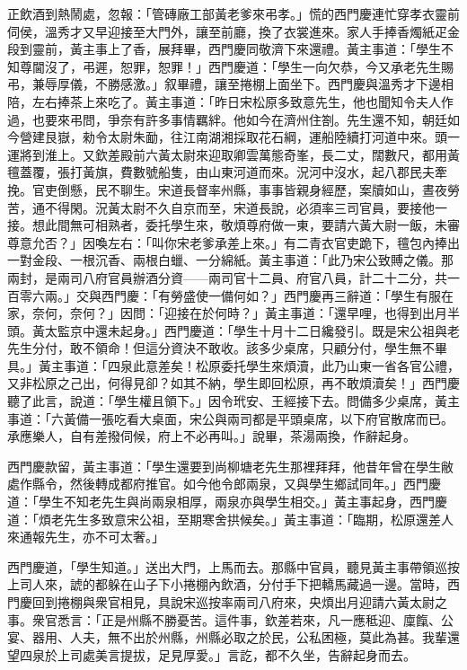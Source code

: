 正飲酒到熱鬧處，忽報：「管磚廠工部黃老爹來弔孝。」慌的西門慶連忙穿孝衣靈前伺侯，溫秀才又早迎接至大門外，讓至前廳，換了衣裳進來。家人手捧香燭紙疋金段到靈前，黃主事上了香，展拜畢，西門慶同敬濟下來還禮。黃主事道：「學生不知尊閫沒了，弔遲，恕罪，恕罪！」西門慶道：「學生一向欠恭，今又承老先生賜弔，兼辱厚儀，不勝感激。」叙畢禮，讓至捲棚上面坐下。西門慶與溫秀才下邊相陪，左右捧茶上來吃了。黃主事道：「昨日宋松原多致意先生，他也聞知令夫人作過，也要來弔問，爭奈有許多事情羈絆。他如今在濟州住劄。先生還不知，朝廷如今營建艮嶽，勑令太尉朱勔，往江南湖湘採取花石綱，運船陸續打河道中來。頭一運將到淮上。又欽差殿前六黃太尉來迎取卿雲萬態奇峯，長二丈，闊數尺，都用黃氊蓋覆，張打黃旗，費數號船隻，由山東河道而來。況河中沒水，起八郡民夫牽挽。官吏倒懸，民不聊生。{}宋道長督率州縣，事事皆親身經歷，案牘如山，晝夜勞苦，通不得閑。況黃太尉不久自京而至，宋道長說，必須率三司官員，要接他一接。想此間無可相熟者，委托學生來，敬煩尊府做一東，要請六黃大尉一飯，未審尊意允否？」因喚左右：「叫你宋老爹承差上來。」有二青衣官吏跪下，氊包內捧出一對金段、一根沉香、兩根白蠟、一分綿紙。黃主事道：「此乃宋公致賻之儀。那兩封，是兩司八府官員辦酒分資——兩司官十二員、府官八員，計二十二分，共一百零六兩。」交與西門慶：「有勞盛使一備何如？」西門慶再三辭道：「學生有服在家，奈何，奈何？」因問：「迎接在於何時？」黃主事道：「還早哩，也得到出月半頭。黃太監京中還未起身。」西門慶道：「學生十月十二日纔發引。既是宋公祖與老先生分付，敢不領命！但這分資決不敢收。該多少桌席，只顧分付，學生無不畢具。」黃主事道：「四泉此意差矣！松原委托學生來煩瀆，此乃山東一省各官公禮，又非松原之己出，何得見卻？如其不納，學生即回松原，再不敢煩瀆矣！」{}西門慶聽了此言，說道：「學生權且領下。」因令玳安、王經接下去。問備多少桌席，黃主事道：「六黃備一張吃看大桌面，宋公與兩司都是平頭桌席，以下府官散席而已。承應樂人，自有差撥伺候，府上不必再叫。」說畢，茶湯兩換，作辭起身。

西門慶款留，黃主事道：「學生還要到尚柳塘老先生那裡拜拜，他昔年曾在學生敝處作縣令，然後轉成都府推官。如今他令郎兩泉，又與學生鄉試同年。」{}西門慶道：「學生不知老先生與尚兩泉相厚，兩泉亦與學生相交。」黃主事起身，西門慶道：「煩老先生多致意宋公祖，至期寒舍拱候矣。」黃主事道：「臨期，松原還差人來通報先生，亦不可太奢。」

西門慶道，「學生知道。」送出大門，上馬而去。那縣中官員，聽見黃主事帶領巡按上司人來，諕的都躲在山子下小捲棚內飲酒，分付手下把轎馬藏過一邊。{}當時，西門慶回到捲棚與衆官相見，具說宋巡按率兩司八府來，央煩出月迎請六黃太尉之事。衆官悉言：「正是州縣不勝憂苦。這件事，欽差若來，凡一應秪迎、廩餼、公宴、器用、人夫，無不出於州縣，州縣必取之於民，公私困極，莫此為甚。我輩還望四泉於上司處美言提拔，足見厚愛。」言訖，都不久坐，告辭起身而去。

